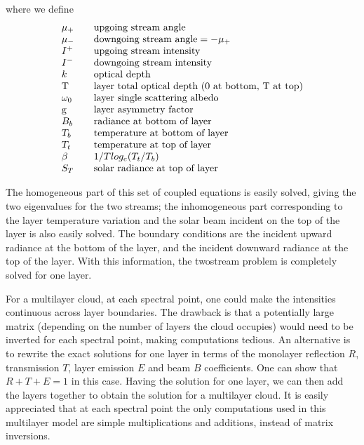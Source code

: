 \documentclass[11pt]{article}
\begin{document}
where we define
\[
\begin{array}{lcl}
\mu_{+}            & & \mbox{upgoing stream angle} \\
\mu_{-}            & & \mbox{downgoing stream angle} = -\mu_{+} \\
I^{+}              & & \mbox{upgoing stream intensity} \\
I^{-}              & & \mbox{downgoing stream intensity} \\
k               & & \mbox{optical depth} \\
$T$           & & \mbox{layer total optical depth (0 at bottom, T at top)} \\
\omega_{0}         & & \mbox{layer single scattering albedo} \\
$g$         & & \mbox{layer asymmetry factor} \\
B_{b}        & & \mbox{radiance at bottom of layer} \\
T_{b}        & & \mbox{temperature at bottom of layer} \\
T_{t}        & & \mbox{temperature at top of layer} \\
\beta        & & 1/T log_{e}(T_{t}/T_{b}) \\
S_{T}        & & \mbox{solar radiance at top of layer} 
\end{array}
\]

The homogeneous part of this set of coupled equations is easily solved, giving
the two eigenvalues for the two streams; the inhomogeneous part corresponding 
to the layer temperature variation and the solar beam incident on the top of 
the layer is also easily solved. The boundary conditions are the incident
upward radiance at the bottom of the layer, and the incident downward 
radiance at the top of the layer. With this information, the twostream 
problem is completely solved for one layer.

For a multilayer cloud, at each spectral point, one could make the intensities
continuous across layer boundaries. The drawback is that a potentially large 
matrix (depending on the number of layers the cloud occupies) would need to 
be inverted for each spectral point, making computations tedious. An 
alternative is to rewrite the exact solutions for one layer in terms of the 
monolayer reflection $R$, transmission $T$, layer 
emission $E$ and beam $B$ coefficients. One can show that $R+T+E = 1$ in this 
case. Having the solution for one layer, we can then add the layers together 
to obtain the solution for a multilayer cloud. It is easily appreciated 
that at each spectral point the only computations used in this multilayer 
model are simple multiplications and additions, instead of matrix inversions.
\end{document}
